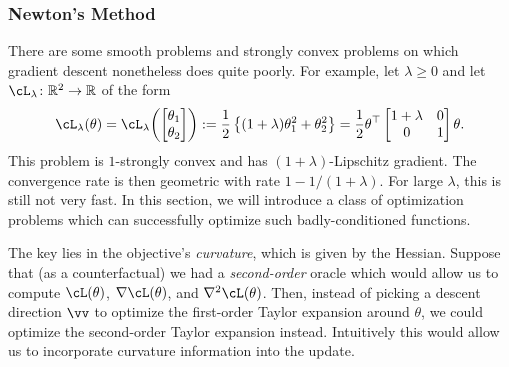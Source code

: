 \documentclass[../../book-main.tex]{subfiles}
\begin{document}
\subsubsection{Newton's Method}

There are some smooth problems and strongly convex problems on which gradient descent nonetheless does quite poorly. For example, let \(\lambda \geq 0\) and let \(\cL_{\lambda} \colon \R^{2} \to \R\) of the form 
\begin{equation}
    \cL_{\lambda}(\theta) = \cL_{\lambda}\rp{\mat{\theta_{1} \\ \theta_{2}}} := \frac{1}{2}\bc{(1 + \lambda) \theta_{1}^{2} + \theta_{2}^{2}} = \frac{1}{2}\theta^{\top}\mat{1 + \lambda & 0 \\ 0 & 1}\theta.
\end{equation}
This problem is \(1\)-strongly convex and has \((1 + \lambda)\)-Lipschitz gradient. The convergence rate is then geometric with rate \(1 - 1/(1 + \lambda)\). For large \(\lambda\), this is still not very fast. In this section, we will introduce a class of optimization problems which can successfully optimize such badly-conditioned functions.

The key lies in the objective's \textit{curvature}, which is given by the Hessian. Suppose that (as a counterfactual) we had a \textit{second-order} oracle which would allow us to compute \(\cL(\theta)\), \(\nabla \cL(\theta)\), and \(\nabla^{2}\cL(\theta)\). Then, instead of picking a descent direction \(\vv\) to optimize the first-order Taylor expansion around \(\theta\), we could optimize the second-order Taylor expansion instead. Intuitively this would allow us to incorporate curvature information into the update.
\end{document}
